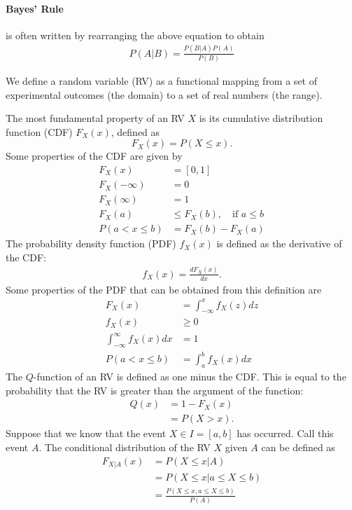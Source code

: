 \paragraph{Bayes' Rule }is often written by rearranging the above equation to obtain 
\begin{align*}
	P(A|B) = \frac{P(B|A)P(A)}{P(B)}
\end{align*}

We define a random variable (RV) as a functional mapping from a set of experimental outcomes (the domain) to a set of real numbers (the range).

The most fundamental property of an RV $X$ is its cumulative distribution function (CDF) $F_X(x)$, defined as 
$$F_{X}(x) = P(X\leq x).$$
Some properties of the CDF are given by
\begin{align*}
	F_X(x)&= [0,1]\\
	F_X(-\infty)&= 0\\
	F_X(\infty)&= 1\\
	F_X(a)&\leq F_X(b), \quad \text{if }a\leq b \\
	P(a<x\leq b)&=F_X(b)-F_X(a)
\end{align*}
The probability density function (PDF) $f_X(x)$ is defined as the derivative of the CDF:
\begin{align*}
	f_X(x) = \frac{dF_X(x)}{dx}.
\end{align*}
Some properties of the PDF that can be obtained from this definition are
\begin{align*}
	F_X(x) &= \int_{-\infty}^xf_X(z)dz\\
	f_X(x)&\geq 0\\
	\int_{-\infty}^{\infty}f_X(x)dx&= 1\\
	P(a<x\leq b)&=\int_{a}^bf_X(x)dx
\end{align*}
The $Q$-function of an RV is defined as one minus the CDF. This is equal to the probability that the RV is greater than the argument of the function: 
\begin{align*}
	Q(x)&= 1-F_X(x)\\
		&= P(X>x).
\end{align*}
Suppose that we know that the event $X\in I=[a,b]$ has occurred. Call this event $A$. The conditional distribution of the RV $X$ given $A$ can be defined as
\begin{align*}
	F_{X|A}(x)&= P(X\leq x|A)\\
			&= P(X\leq x|a\leq X \leq b)\\
			&= \frac{P(X\leq x,a\leq X \leq b)}{P(A)}\\
\end{align*}
